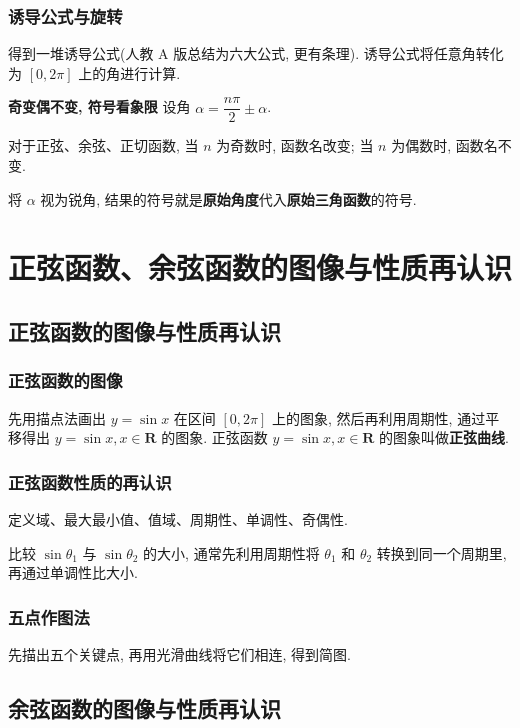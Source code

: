 \documentclass[titlepage]{ctexart}
\begin{document}
\subsubsection{诱导公式与旋转}
得到一堆诱导公式(人教 A 版总结为六大公式, 更有条理). 诱导公式将任意角转化为 $[0, 2\pi]$ 上的角进行计算.

\textbf{奇变偶不变, 符号看象限} \quad 设角 $\alpha = \dfrac{n\pi}{2}\pm \alpha$. 

对于正弦、余弦、正切函数, 当 $n$ 为奇数时, 函数名改变; 当 $n$ 为偶数时, 函数名不变.

将 $\alpha$ 视为锐角, 结果的符号就是\textbf{原始角度}代入\textbf{原始三角函数}的符号.


\section{正弦函数、余弦函数的图像与性质再认识}

\subsection{正弦函数的图像与性质再认识}

\subsubsection{正弦函数的图像}

先用描点法画出 $y = \sin x$ 在区间 $[0, 2\pi]$ 上的图象, 然后再利用周期性, 通过平移得出 $y = \sin x, x \in \mathbf{R}$ 的图象.
正弦函数 $y = \sin x, x \in \mathbf{R}$ 的图象叫做\textbf{正弦曲线}.

\subsubsection{正弦函数性质的再认识}

定义域、最大最小值、值域、周期性、单调性、奇偶性.

比较 $\sin \theta_1$ 与 $\sin \theta_2$ 的大小, 通常先利用周期性将 $\theta_1$ 和 $\theta_2$ 转换到同一个周期里, 再通过单调性比大小.

\subsubsection{五点作图法}

先描出五个关键点, 再用光滑曲线将它们相连, 得到简图.

\subsection{余弦函数的图像与性质再认识}
\end{document}
